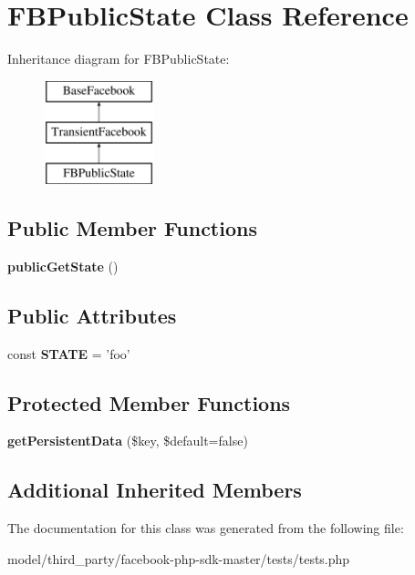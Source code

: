 \hypertarget{classFBPublicState}{\section{F\-B\-Public\-State Class Reference}
\label{classFBPublicState}
}
Inheritance diagram for F\-B\-Public\-State\-:\begin{figure}[H]
\begin{center}
\leavevmode
\includegraphics[height=3.000000cm]{classFBPublicState}
\end{center}
\end{figure}
\subsection*{Public Member Functions}
\begin{DoxyCompactItemize}
\item 
\hypertarget{classFBPublicState_a61058ca4542784def3fcd20eb9872d34}{{\bfseries public\-Get\-State} ()}\label{classFBPublicState_a61058ca4542784def3fcd20eb9872d34}

\end{DoxyCompactItemize}
\subsection*{Public Attributes}
\begin{DoxyCompactItemize}
\item 
\hypertarget{classFBPublicState_a66ff1d27e9b452eed6697bf502fa213d}{const {\bfseries S\-T\-A\-T\-E} = 'foo'}\label{classFBPublicState_a66ff1d27e9b452eed6697bf502fa213d}

\end{DoxyCompactItemize}
\subsection*{Protected Member Functions}
\begin{DoxyCompactItemize}
\item 
\hypertarget{classFBPublicState_a023d9df6dd9b4d4a7ef63300a3aeca35}{{\bfseries get\-Persistent\-Data} (\$key, \$default=false)}\label{classFBPublicState_a023d9df6dd9b4d4a7ef63300a3aeca35}

\end{DoxyCompactItemize}
\subsection*{Additional Inherited Members}


The documentation for this class was generated from the following file\-:\begin{DoxyCompactItemize}
\item 
model/third\-\_\-party/facebook-\/php-\/sdk-\/master/tests/tests.\-php\end{DoxyCompactItemize}
